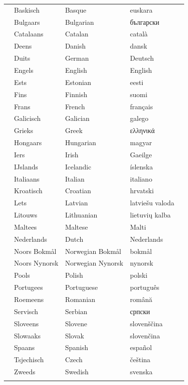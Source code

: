 \cleardoublepage

\label{whitepaperseries}

\vspace*{-5mm}
\centering
  \setlength{\tabcolsep}{2.5em}
  \begin{tabularx}{\textwidth}{lllll} \toprule\addlinespace
  &Baskisch & Basque & euskara& \\
  &Bulgaars & Bulgarian & български& \\
  &Catalaans & Catalan & català& \\
&Deens & Danish & dansk& \\
  &Duits & German & Deutsch& \\
  &Engels & English & English& \\
  &Ests & Estonian & eesti& \\
  &Fins & Finnish & suomi& \\
  &Frans & French & français& \\
  &Galicisch & Galician & galego& \\
  &Grieks & Greek & ελληνικά& \\
  &Hongaars & Hungarian & magyar& \\
  &Iers & Irish & Gaeilge& \\
  &IJslands & Icelandic & íslenska& \\
  &Italiaans & Italian & italiano& \\
&Kroatisch & Croatian & hrvatski& \\
  &Lets & Latvian & latviešu valoda& \\
  &Litouws & Lithuanian & lietuvių kalba& \\
  &Maltees & Maltese & Malti& \\
  &Nederlands & Dutch & Nederlands& \\
  &Noors Bokmål & Norwegian Bokmål & bokmål& \\
  &Noors Nynorsk & Norwegian Nynorsk & nynorsk& \\
  &Pools & Polish & polski& \\
  &Portugees & Portuguese & português& \\
  &Roemeens & Romanian & română& \\
  &Servisch & Serbian & српски& \\
  &Sloveens & Slovene & slovenščina& \\
  &Slowaaks & Slovak & slovenčina& \\
  &Spaans & Spanish & español& \\
  &Tsjechisch & Czech & čeština& \\
  &Zweeds & Swedish & svenska& \\
\addlinespace \bottomrule
\end{tabularx}


